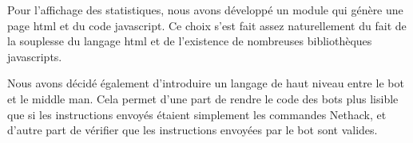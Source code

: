 Pour l'affichage des statistiques, nous avons développé un module qui génère une page html et du code javascript. Ce choix s'est fait assez naturellement du fait de la souplesse du langage html et de l'existence de  nombreuses bibliothèques javascripts. 

Nous avons décidé également d'introduire un langage de haut niveau entre le bot et le middle man. Cela permet d'une part de rendre le code des bots plus lisible que si les instructions envoyés étaient simplement les commandes Nethack, et d'autre part de vérifier que les instructions envoyées par le bot sont valides. 
